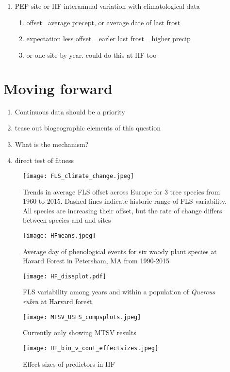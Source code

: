 \documentclass{article}
\begin{document}
\begin{enumerate}
    \item PEP site or HF interannual variation with climatological data %
    \begin{enumerate}
    \item offset~ average precept, or average date of last frost
    \item expectation less offset= earler last frost= higher precip
    \item or one site by year. could do this at HF too
    
    \end{enumerate}
    \end{enumerate}
 \section{Moving forward}
 \begin{enumerate}
     \item Continuous data should be a priority
     \item tease out biogeographic elements of this question
     \item What is the mechanism?
     \item direct test of fitness
 \end{enumerate}

\begin{figure}
    \centering
 \texttt{[image: FLS\_climate\_change.jpeg]} 
    \caption{Trends in average FLS offset across Europe for 3 tree species from 1960 to 2015. Dashed lines indicate historic range of FLS variability. All species are increasing their offset, but the rate of change differs between species and and sites}
    \label{fig:Figure 1}
\end{figure}
\begin{figure}
    \centering
    \texttt{[image: HFmeans.jpeg]}
    \caption{Average day of phenological events for six woody plant species at Havard Forest in Petersham, MA from 1990-2015}
    \label{fig:Figure 2}
\end{figure}
 \begin{figure}
        \centering
          \texttt{[image: HF\_dissplot.pdf]}
        \caption{FLS variability among years and within a population of \textit{Quercus rubra} at Harvard forest.}
        \label{fig: Figure 3}
    \end{figure}
     \begin{figure}
    \centering
    \texttt{[image: MTSV\_USFS\_compsplots.jpeg]}
    \caption{Currently only showing MTSV results}
    \label{fig:Figure 4}
\end{figure}
    \begin{figure}
    \centering
    \texttt{[image: HF\_bin\_v\_cont\_effectsizes.jpeg]} 
    \caption{Effect sizes of predictors in HF}
    \label{fig:Figure 5}
    \end{figure}
\end{document}
